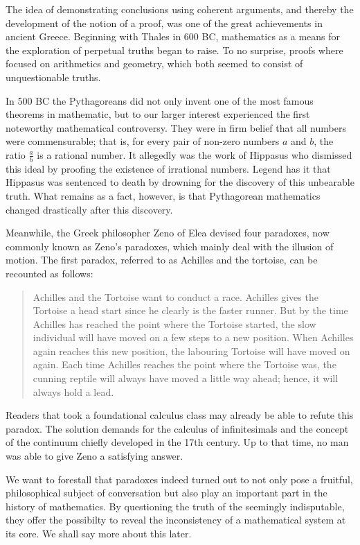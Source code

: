 \documentclass[hidelinks]{article}
\theoremstyle{plain}
\theoremstyle{definition}
\theoremstyle{rem}
\begin{document}
The idea of demonstrating conclusions using coherent arguments, and thereby the development of the notion of a proof, was one of the great achievements in ancient Greece.
Beginning with Thales in 600 BC, mathematics as a means for the exploration of perpetual truths began to raise. To no surprise, proofs where focused on arithmetics and geometry, which both seemed to consist of unquestionable truths.

In 500 BC the Pythagoreans did not only invent one of the most famous theorems in mathematic, but to our larger interest experienced the first noteworthy mathematical controversy. They were in firm belief that all numbers were commensurable; that is, for every pair of non-zero numbers $a$ and $b$, the ratio $\frac{a}{b}$ is a rational number. It allegedly was the work of Hippasus who dismissed this ideal by proofing the existence of irrational numbers. Legend has it that Hippasus was sentenced to death by drowning for the discovery of this unbearable truth. What remains as a fact, however, is that Pythagorean mathematics changed drastically after this discovery.

Meanwhile, the Greek philosopher Zeno of Elea devised four paradoxes, now commonly known as Zeno's paradoxes, which mainly deal with the illusion of motion. The first paradox, referred to as Achilles and the tortoise, can be recounted as follows:
\begin{quote}\label{zeno_paradox}
Achilles and the Tortoise want to conduct a race. Achilles gives the Tortoise a head start since he clearly is the faster runner. But by the time Achilles has reached the point where the Tortoise started, the slow individual will have moved on a few steps to a new position. When Achilles again reaches this new position, the labouring Tortoise will have moved on again. Each time Achilles reaches the point where the Tortoise was, the cunning reptile will always have moved a little way ahead; hence, it will always hold a lead.
\end{quote}
Readers that took a foundational calculus class may already be able to refute this paradox. The solution demands for the calculus of infinitesimals and the concept of the continuum chiefly developed in the 17th century. Up to that time, no man was able to give Zeno a satisfying answer.

We want to forestall that paradoxes indeed turned out to not only pose a fruitful, philosophical subject of conversation but also play an important part in the history of mathematics. By questioning the truth of the seemingly indisputable, they offer the possibilty to reveal the inconsistency of a mathematical system at its core. We shall say more about this later.
\end{document}

